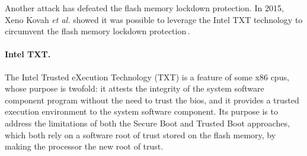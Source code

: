 Another attack has defeated the flash memory lockdown protection.
%
In 2015, Xeno Kovah \emph{et al.} showed it was possible to leverage the Intel
TXT technology to circumvent the flash memory lockdown
protection\,\cite{kovah2015senter}.

\paragraph{Intel TXT.}
%
The Intel Trusted eXecution Technology (TXT)\cite{intel2015txt} is a feature of
some x86 \acp{cpu}, whose purpose is twofold: it attests the integrity of the
system software component program without the need to trust the \ac{bios}, and
it provides a trusted execution environment to the system software component.
%
Its purpose is to address the limitations of both the Secure Boot and Trusted
Boot approaches, which both rely on a software root of trust stored on the flash
memory, by making the processor the new root of trust.
%

